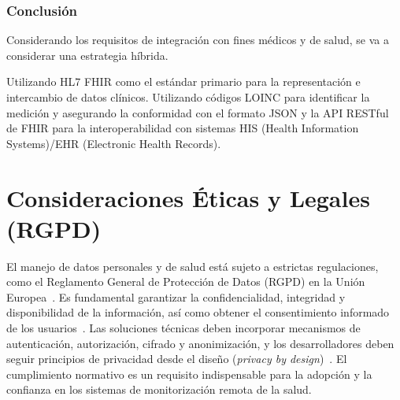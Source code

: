 \subsubsection{Conclusión}
Considerando los requisitos de integración con fines médicos y de salud, se va a considerar una estrategia híbrida. 

Utilizando HL7 FHIR como el estándar primario para la representación e intercambio de datos clínicos. Utilizando códigos LOINC para identificar la medición y asegurando la conformidad con el formato JSON y la API RESTful de FHIR para la interoperabilidad con sistemas HIS (Health Information Systems)/EHR (Electronic Health Records). 


\section{Consideraciones Éticas y Legales (RGPD)}

El manejo de datos personales y de salud está sujeto a estrictas regulaciones, como el Reglamento General de Protección de Datos (RGPD) en la Unión Europea~\cite{RGPD}. Es fundamental garantizar la confidencialidad, integridad y disponibilidad de la información, así como obtener el consentimiento informado de los usuarios~\cite{Rumbold2021}. Las soluciones técnicas deben incorporar mecanismos de autenticación, autorización, cifrado y anonimización, y los desarrolladores deben seguir principios de privacidad desde el diseño (\textit{privacy by design})~\cite{Cavoukian2011}. El cumplimiento normativo es un requisito indispensable para la adopción y la confianza en los sistemas de monitorización remota de la salud.
